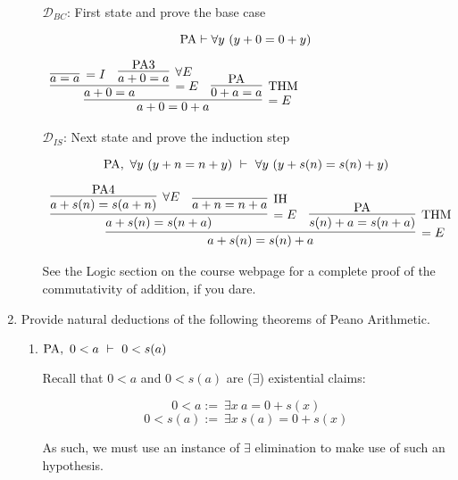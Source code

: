 \documentclass[11pt]{report}
\begin{document}
\begin{enumerate}
\begin{enumerate}
		$\mathcal{D}_{BC}$: First state and prove the base case 

		$$ \text{PA} \vdash \forall y \ (y + 0 = 0 + y)$$

		\begin{mdframed}
			\begin{center}
				$\begin{array}{c}
					\infer[=E]{a + 0 = 0 + a}
						{\infer[=E]{a + 0 = a}
							{\infer[=I]{a=a}{}
							&
							\infer[\forall E]{a + 0 = a}{\PA 3}}
						&
						\infer[\THM]{0 + a = a}{\PA}}
				\end{array}$
			\end{center}
		\end{mdframed}

		$\mathcal{D}_{IS}$: Next state and prove the induction step

		$$ \PA, \ \forall y \ (y + n  = n + y) \ \vdash \ \forall y \ (y + s(n)  = s(n) + y)$$

		\begin{mdframed}
			\begin{center}
				$\begin{array}{c}
					\infer[=E]{a + s(n) = s(n) + a}
						{\infer[=E]{a + s(n) = s(n + a)}
							{\infer[\forall E]{a + s(n) = s(a+n)}
								{\PA 4}
							&
							\infer[\IH]{a + n = n + a}
								{}}
						&
						\infer[\THM]{s(n) + a = s(n+a)}{\PA}}
				\end{array}$
			\end{center}
		\end{mdframed}
		
		See the Logic section on the course webpage for a complete proof of the commutativity of addition, if you dare.
		
		\newpage
	\end{enumerate}

	\newpage
	\item Provide natural deductions of the following theorems of Peano Arithmetic.
	
		\begin{enumerate}
			\item $\text{PA} , \ 0 < a \ \vdash \ 0 < s(a)$
			
			Recall that $0 < a$ and $0 < s(a)$ are ($\exists$) existential claims:
			
			$$0 < a := \ \exists x \ a = 0 + s(x)$$
			$$0 < s(a) := \ \exists x \ s(a) = 0 + s(x)$$
			
			As such, we must use an instance of $\exists$ elimination to make use of such an hypothesis.
			

\end{enumerate}
\end{enumerate}
\end{document}
